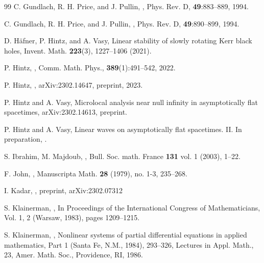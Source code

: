 \documentclass[10pt,a4paper,reqno]{amsart}
\theoremstyle{definition}
\theoremstyle{remark}
\numberwithin{equation}{section}
\begin{document}
\begin{thebibliography}{99}
 C. Gundlach, R. H. Price, and J. Pullin, 
,
\newblock Phys. Rev. D, \textbf{49}:883--889, 1994.

 C. Gundlach, R. H. Price, and J. Pullin, 
,
\newblock Phys. Rev. D, \textbf{49}:890--899, 1994.


 D. Häfner, P. Hintz, and A. Vasy,
\newblock Linear stability of slowly rotating Kerr black holes,
\newblock Invent. Math. \textbf{223}(3), 1227–1406 (2021). %


 P. Hintz, 
,
\newblock Comm. Math. Phys., \textbf{389}(1):491--542, 2022.

 P. Hintz, 
,
\newblock arXiv:2302.14647, preprint, 2023.


 P. Hintz and A. Vasy,
\newblock Microlocal analysis near null infinity in asymptotically flat spacetimes,
\newblock arXiv:2302.14613, preprint.

 P. Hintz and A. Vasy,
\newblock Linear waves on asymptotically flat spacetimes. II. In preparation,
.

 S. Ibrahim, M. Majdoub,
,
\newblock Bull. Soc. math. France \textbf{131} vol. 1 (2003), 1–22.

 F. John,
,
\newblock Manuscripta Math. \textbf{28} (1979), no. 1-3, 235--268. %


     I. Kadar, 
    , 
    \newblock preprint, arXiv:2302.07312 

 S. Klainerman, 
,
\newblock In Proceedings of the International Congress of Mathematicians, Vol. 1, 2 (Warsaw, 1983), pages 1209--1215.

 S. Klainerman, 
,
\newblock Nonlinear systems of partial differential equations in applied mathematics, Part 1 (Santa Fe, N.M., 1984), 293--326,  Lectures in Appl. Math., 23, Amer. Math. Soc., Providence, RI, 1986.


\end{thebibliography}
\end{document}
